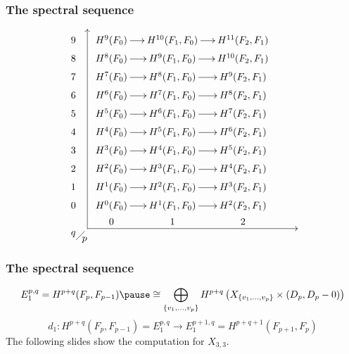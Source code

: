 \documentclass{beamer} %
\newcommand{\set}[1]{\left\{ #1 \right\}}
\begin{document}
\begin{frame}[shrink]
  \frametitle{The spectral sequence}
  \[ \xy
  (5,4); (5,-67); **\dir{-}; (5,4); *\dir{>};
  (5,-67); (80,-67); **\dir{-}; *\dir{<};
  (0,-69)*{q}; (4,-71)*{p};
  (1,-71); (4,-68); **\dir{-};
  (0,0)\xymatrix@R=0.2em@C=1.4em{
    9 & H^{9}(F_0) \ar[r] & H^{10}(F_1,F_0) \ar[r] & H^{11}(F_2,F_1) \\
    8 & H^{8}(F_0) \ar[r] & H^{9}(F_1,F_0) \ar[r] & H^{10}(F_2,F_1) \\
    7 & H^{7}(F_0) \ar[r] & H^{8}(F_1,F_0) \ar[r] & H^{9}(F_2,F_1) \\
    6 & H^{6}(F_0) \ar[r] & H^{7}(F_1,F_0) \ar[r] & H^{8}(F_2,F_1) \\
    5 & H^{5}(F_0) \ar[r] & H^{6}(F_1,F_0) \ar[r] & H^{7}(F_2,F_1) \\
    4 & H^{4}(F_0) \ar[r] & H^{5}(F_1,F_0) \ar[r] & H^{6}(F_2,F_1) \\
    3 & H^{3}(F_0) \ar[r] & H^{4}(F_1,F_0) \ar[r] & H^{5}(F_2,F_1) \\
    2 & H^{2}(F_0) \ar[r] & H^{3}(F_1,F_0) \ar[r] & H^{4}(F_2,F_1) \\
    1 & H^{1}(F_0) \ar[r] & H^{2}(F_1,F_0) \ar[r] & H^{3}(F_2,F_1) \\
    0 & H^{0}(F_0) \ar[r] & H^{1}(F_1,F_0) \ar[r] & H^{2}(F_2,F_1) \\
    & 0 & 1 & 2
  } \endxy \]
\end{frame}


\begin{frame}
  \frametitle{The spectral sequence}
  \[ E_1^{p,q} = H^{p+q}(F_p,F_{p-1}) \pause\cong
  \bigoplus_{\set{v_1,\dots,v_p}}
  H^{p+q}\left(X_{\set{v_1,\dots,v_p}} \times (D_p,D_p-0)\right)\] \pause
  \[ d_1 : H^{p+q}(F_p,F_{p-1}) = E_1^{p,q} \to E_1^{p+1,q} =
  H^{p+q+1}(F_{p+1},F_p) \]
  \newline \pause
  The following slides show the computation for $X_{3,3}$.
\end{frame}
\end{document}
